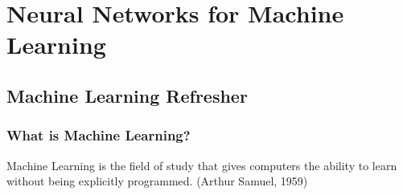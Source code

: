 \section{Neural Networks for Machine Learning}
\label{sec:ann_ml}

\subsection{Machine Learning Refresher}
\label{sec:refresher}

\begin{frame}
  \frametitle{What is Machine Learning?}
  \begin{definition}
    \alert{Machine Learning} \pause is the field of study that gives
    computers the ability to learn without being explicitly
    programmed. (Arthur Samuel, 1959)
  \end{definition}
\end{frame}

